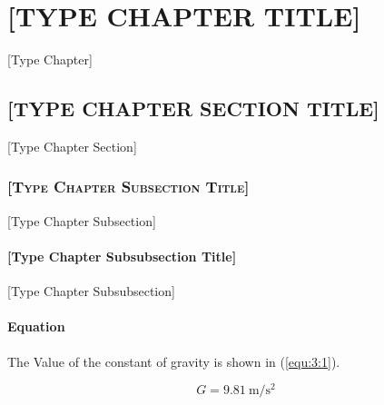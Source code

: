 \chapter{\uppercase{[Type Chapter Title]}}
[Type Chapter]
\section{\uppercase{[Type Chapter Section Title]}}
[Type Chapter Section]
\subsection{\textsc{[Type Chapter Subsection Title]}}
[Type Chapter Subsection]
\subsubsection{[Type Chapter Subsubsection Title]}
[Type Chapter Subsubsection]
\subsubsection{Equation}
The Value of the constant of gravity is shown in (\ref{equ:3:1}).

\begin{equation}
\label{equ:3:1}
G=9.81\ \si{\m\per\square\s}
\end{equation}